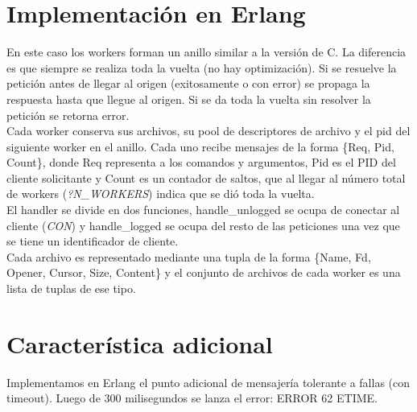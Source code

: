 \documentclass[a4paper,12pt]{article}
\begin{document}
    
\section*{Implementación en Erlang}
    En este caso los workers forman un anillo similar a la versión de C. La diferencia es que siempre se realiza toda la vuelta (no hay optimización). Si se resuelve la petición antes de llegar al origen (exitosamente o con error) se propaga la respuesta hasta que llegue al origen. Si se da toda la vuelta sin resolver la petición se retorna error.\\
    Cada worker conserva sus archivos, su pool de descriptores de archivo y el pid del siguiente worker en el anillo. Cada uno recibe mensajes de la forma \{Req, Pid, Count\}, donde Req representa a los comandos y argumentos, Pid es el PID del cliente solicitante y Count es un contador de saltos, que al llegar al número total de workers (\textit{?N\_WORKERS}) indica que se dió toda la vuelta.\\
    El handler se divide en dos funciones, handle\_unlogged se ocupa de conectar al cliente (\textit{CON}) y handle\_logged se ocupa del resto de las peticiones una vez que se tiene un identificador de cliente.\\
    Cada archivo es representado mediante una tupla de la forma \{Name, Fd, Opener, Cursor, Size, Content\} y el conjunto de archivos de cada worker es una lista de tuplas de ese tipo.

\section*{Característica adicional}
    Implementamos en Erlang el punto adicional de mensajería tolerante a fallas (con timeout). Luego de 300 milisegundos se lanza el error: ERROR 62 ETIME.\\
\end{document}
